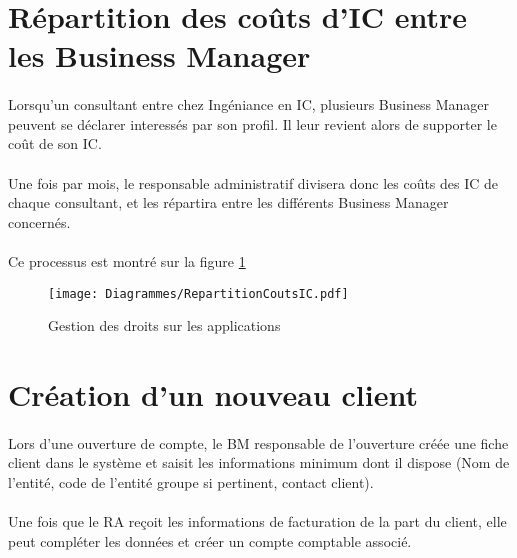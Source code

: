 \section{Répartition des coûts d'IC entre les Business Manager}

\paragraph{} Lorsqu'un consultant entre chez Ingéniance en IC, plusieurs Business Manager peuvent se déclarer interessés par son profil. Il leur revient alors de supporter le coût de son IC.
\paragraph{} Une fois par mois, le responsable administratif divisera donc les coûts des IC de chaque consultant, et les répartira entre les différents Business Manager concernés.
\paragraph{} Ce processus est montré sur la figure \ref{coutsIC}

\begin{figure}
	\centering
	\texttt{[image: Diagrammes/RepartitionCoutsIC.pdf]}
	\caption{Gestion des droits sur les applications}
	\label{coutsIC}
\end{figure}



\section{Création d'un nouveau client}

\paragraph{} Lors d'une ouverture de compte, le BM responsable de l'ouverture créée une fiche client dans le système et saisit les informations minimum dont il dispose (Nom de l'entité, code de l'entité groupe si pertinent, contact client).

\paragraph{} Une fois que le RA reçoit les informations de facturation de la part du client, elle peut compléter les données et créer un compte comptable associé.
